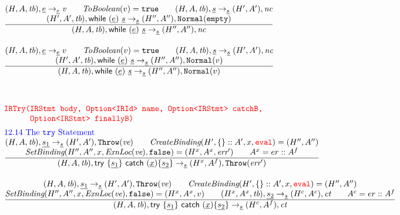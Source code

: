 \[\begin{array}{l@{~~}l@{~~}ll}
\frac{\begin{matrix}
\evale, \irexpr \rightarrow_{\ir\expr} \emph{v} 
\rulesep
\hf{ToBoolean}(v) = \true
\rulesep
\statel, \ir\stmt \rightarrow_{\ir\stmt} \resp, \nc
\\
\statep, \irwhile \rightarrow_{\ir{\stmt}} \respp, \void
\end{matrix}}
{\begin{matrix}
\state, \irwhile \rightarrow_{\ir{\stmt}} \respp, \nc
\end{matrix}}
\\[2em]

\frac{\begin{matrix}
\evale, \irexpr \rightarrow_{\ir\expr} v
\rulesep
\hf{ToBoolean}(v) = \true
\rulesep
\statel, \ir\stmt \rightarrow_{\ir\stmt} \resp, \nc
\\
\statep, \irwhile \rightarrow_{\ir{\stmt}} \respp, {\tt Normal}(v)
\end{matrix}}
{\begin{matrix}
\state, \irwhile \rightarrow_{\ir{\stmt}} \respp, {\tt Normal}(v)
\end{matrix}}
\\[4em]


\mtt{\normalsize\inred IRTry(IRStmt body, Option<IRId> name, Option<IRStmt> catchB,}\\
\mtt{\normalsize\inred \phantom{IRTry(}Option<IRStmt> finallyB)}\\[.5em]
\mbox{\inblue 12.14 The {\tt try} Statement}\\
\frac{\begin{matrix}
\statel, \ir{\stmt_1} \rightarrow_{\ir\stmt} \resp, {\tt Throw}(\emph{ve})
\rulesep
\hf{CreateBinding}(H', \{\}::A',x,\eval)=\respp
\\
\hf{SetBinding}(H'', A'', x, \hf{ExnLoc}(\emph{ve}), \false) = (H^x, A^x, \err')
\rulesep
A^x = er::A^f
\end{matrix}}{\begin{matrix}
\state, \irtrycat \rightarrow_{\ir\stmt} (H^x, A^f), {\tt Throw}(\err')
\end{matrix}}
\\[2em]

\frac{\begin{matrix}
\statel, \ir{\stmt_1} \rightarrow_{\ir\stmt} \resp, {\tt Throw}(\emph{ve})
\rulesep
\hf{CreateBinding}(H',\{\}::A',x,\eval)=\respp
\\
\hf{SetBinding}(H'', A'', x, \hf{ExnLoc}(\emph{ve}), \false) = (H^x, A^x, v)
\rulesep
(H^x, A^x, \tb), \ir{\stmt_2} \rightarrow_{\ir\stmt} (H^c, A^c), \ct
\rulesep
A^c = er::A^f
\end{matrix}}{\begin{matrix}
\state, \irtrycat \rightarrow_{\ir\stmt} (H^c, A^f), \ct
\end{matrix}}
\\[2em]


\end{array}\]
